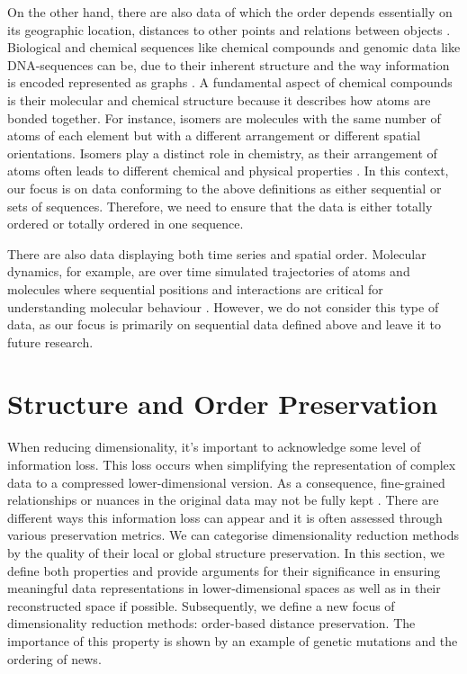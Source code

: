 \documentclass[pdftex,12pt,a4paper]{report}
\begin{document}
On the other hand, there are also data of which the order depends essentially on its geographic location, distances to other points \cite{spatial-data} and relations between objects \cite{graph-data}.
Biological and chemical sequences like chemical compounds \cite{chemical-compounds} and genomic data like DNA-sequences \cite{atoms-graphs} can be, due to their inherent structure and the way information is encoded represented as graphs \cite{atoms-graphs}.
A fundamental aspect of chemical compounds is their molecular and chemical structure because it describes how atoms are bonded together.
For instance, isomers are molecules with the same number of atoms of each element but with a different arrangement or different spatial orientations.
Isomers play a distinct role in chemistry, as their arrangement of atoms often leads to different chemical and physical properties \cite{isomers}.
In this context, our focus is on data conforming to the above definitions as either sequential or sets of sequences.
Therefore, we need to ensure that the data is either totally ordered or totally ordered in one sequence.

There are also data displaying both time series and spatial order.
Molecular dynamics, for example, are over time simulated trajectories of atoms and molecules where sequential positions and interactions are critical for understanding molecular behaviour \cite{dropp}.
However, we do not consider this type of data, as our focus is primarily on sequential data defined above and leave it to future research.


\section{Structure and Order Preservation}
When reducing dimensionality, it's important to acknowledge some level of information loss.
This loss occurs when simplifying the representation of complex data to a compressed lower-dimensional version.
As a consequence, fine-grained relationships or nuances in the original data may not be fully kept \cite{information-loss}.
There are different ways this information loss can appear and it is often assessed through various preservation metrics. 
We can categorise dimensionality reduction methods by the quality of their local or global structure preservation.
In this section, we define both properties and provide arguments for their significance in ensuring meaningful data representations in lower-dimensional spaces as well as in their reconstructed space if possible.
Subsequently, we define a new focus of dimensionality reduction methods: order-based distance preservation.
The importance of this property is shown by an example of genetic mutations and the ordering of news.
\end{document}
